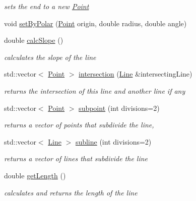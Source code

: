 \begin{DoxyCompactItemize}
\begin{DoxyCompactList}\small\item\em sets the end to a new \mbox{\hyperlink{class_jinks_draw_1_1_point}{Point}} \end{DoxyCompactList}\item 
void \mbox{\hyperlink{class_jinks_draw_1_1_line_a0b2ba2dbbdf5fb51dcf0eda0614e5259}{set\+By\+Polar}} (\mbox{\hyperlink{class_jinks_draw_1_1_point}{Point}} origin, double radius, double angle)
\item 
double \mbox{\hyperlink{class_jinks_draw_1_1_line_aea73a9418815e5d255044a6dbce37e3e}{calc\+Slope}} ()
\begin{DoxyCompactList}\small\item\em calculates the slope of the line \end{DoxyCompactList}\item 
std\+::vector$<$ \mbox{\hyperlink{class_jinks_draw_1_1_point}{Point}} $>$ \mbox{\hyperlink{class_jinks_draw_1_1_line_a159d4850578aff530064d53c7461fa03}{intersection}} (\mbox{\hyperlink{class_jinks_draw_1_1_line}{Line}} \&intersecting\+Line)
\begin{DoxyCompactList}\small\item\em returns the intersection of this line and another line if any \end{DoxyCompactList}\item 
std\+::vector$<$ \mbox{\hyperlink{class_jinks_draw_1_1_point}{Point}} $>$ \mbox{\hyperlink{class_jinks_draw_1_1_line_a43d8f7b708f5e9851a188c755aa0d963}{subpoint}} (int divisions=2)
\begin{DoxyCompactList}\small\item\em returns a vector of points that subdivide the line, \end{DoxyCompactList}\item 
std\+::vector$<$ \mbox{\hyperlink{class_jinks_draw_1_1_line}{Line}} $>$ \mbox{\hyperlink{class_jinks_draw_1_1_line_a79047036e61d10ef3b14c660c32e6d64}{subline}} (int divisions=2)
\begin{DoxyCompactList}\small\item\em returns a vector of lines that subdivide the line \end{DoxyCompactList}\item 
double \mbox{\hyperlink{class_jinks_draw_1_1_line_aeb77107e932c68b88be7e32344db1de4}{get\+Length}} ()
\begin{DoxyCompactList}\small\item\em calculates and returns the length of the line \end{DoxyCompactList}\item 

\end{DoxyCompactItemize}
